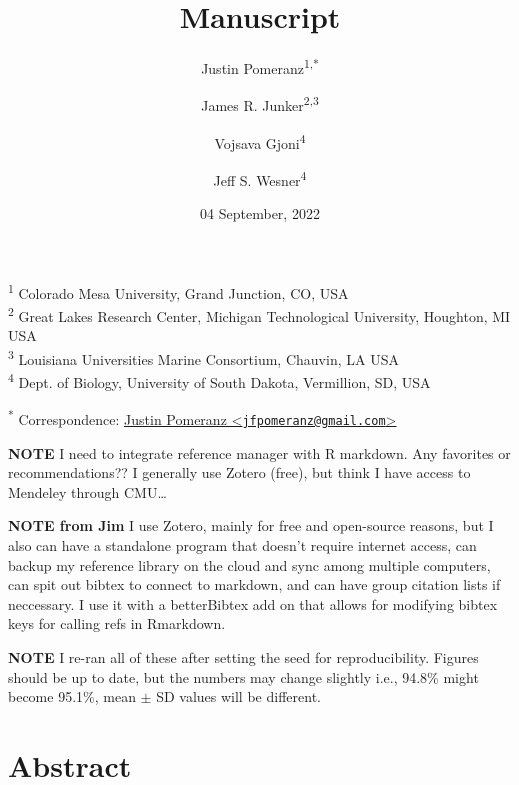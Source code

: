 \documentclass[
]{article}
\title{Manuscript}
\author{Justin Pomeranz\textsuperscript{1,*} \and James R.
Junker\textsuperscript{2,3} \and Vojsava
Gjoni\textsuperscript{4} \and Jeff S. Wesner\textsuperscript{4}}
\date{04 September, 2022}
\begin{document}
\maketitle

{
\setcounter{tocdepth}{2}
\tableofcontents
}
\textsuperscript{1} Colorado Mesa University, Grand Junction, CO, USA\\
\textsuperscript{2} Great Lakes Research Center, Michigan Technological
University, Houghton, MI USA\\
\textsuperscript{3} Louisiana Universities Marine Consortium, Chauvin,
LA USA\\
\textsuperscript{4} Dept. of Biology, University of South Dakota,
Vermillion, SD, USA

\textsuperscript{*} Correspondence:
\href{mailto:jfpomeranz@gmail.com}{Justin Pomeranz
\textless{}\href{mailto:jfpomeranz@gmail.com}{\nolinkurl{jfpomeranz@gmail.com}}\textgreater{}}

\textbf{NOTE} I need to integrate reference manager with R markdown. Any
favorites or recommendations?? I generally use Zotero (free), but think
I have access to Mendeley through CMU\ldots{}

\textbf{NOTE from Jim} I use Zotero, mainly for free and open-source
reasons, but I also can have a standalone program that doesn't require
internet access, can backup my reference library on the cloud and sync
among multiple computers, can spit out bibtex to connect to markdown,
and can have group citation lists if neccessary. I use it with a
betterBibtex add on that allows for modifying bibtex keys for calling
refs in Rmarkdown.

\textbf{NOTE} I re-ran all of these after setting the seed for
reproducibility. Figures should be up to date, but the numbers may
change slightly i.e., 94.8\% might become 95.1\%, mean \(\pm\) SD values
will be different.

\hypertarget{abstract}{%
\section{Abstract}\label{abstract}}
\end{document}
